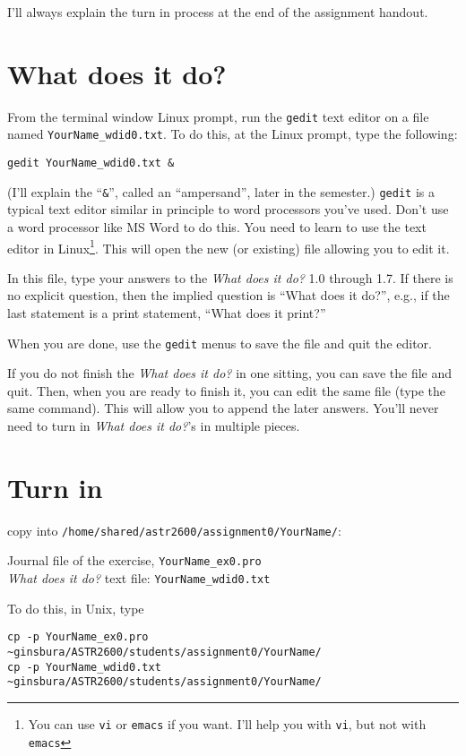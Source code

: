 \documentclass{article}
\begin{document}
\begin{spacing}{1.0}
I’ll always explain the turn in process at the end of the assignment handout.


\section{\textbf{What does it do?} }

From the terminal window Linux prompt, run the \texttt{gedit} text editor on a file named \texttt{YourName\_wdid0.txt}.  To do this, at the Linux prompt, type the following:

\texttt{gedit YourName\_wdid0.txt \&}

(I’ll explain the “\texttt{\&}”, called an “ampersand”, later in the semester.)
\texttt{gedit} is a typical text editor similar in principle to word processors
you’ve used.  Don’t use a word processor like MS Word to do this.  You need to
learn to use the text editor in Linux\footnote{You can use \texttt{vi} or
\texttt{emacs} if you want.  I'll help you with \texttt{vi}, but not with
\texttt{emacs}}.   This will open the new (or existing)
file allowing you to edit it.  

In this file, type your answers to the \emph{What does it do?} 1.0 through 1.7.  If there is no explicit question, then the implied question is “What does it do?”, e.g., if the last statement is a print statement, “What does it print?”

When you are done, use the \texttt{gedit} menus to save the file and quit the editor.

If you do not finish the \emph{What does it do?} in one sitting, you can save the file and quit.  Then, when you are ready to finish it, you can edit the same file (type the same command).  This will allow you to append the later answers.  You’ll never need to turn in \emph{What does it do?}’s in multiple pieces.


\section{Turn in}
copy into \texttt{/home/shared/astr2600/assignment0/YourName/}:
\begin{tabbing}
Journal file of the exercise, \texttt{YourName\_ex0.pro} \\
\emph{What does it do?} text file: \texttt{YourName\_wdid0.txt}
\end{tabbing}

To do this, in Unix, type

\begin{tabbing}
\texttt{cp -p YourName\_ex0.pro \textasciitilde ginsbura/ASTR2600/students/assignment0/YourName/} \\
\texttt{cp -p YourName\_wdid0.txt \textasciitilde ginsbura/ASTR2600/students/assignment0/YourName/}
\end{tabbing}


\end{spacing}
\end{document}
